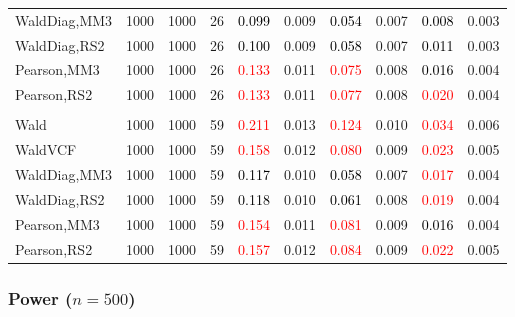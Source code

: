 \documentclass[
]{article}
\begin{document}
\begin{table}[H]
{\begin{tabular}[t]{lrrrrrrlrr}
\hspace{1em}WaldDiag,MM3 & 1000 & 1000 & 26 & \textcolor{black}{0.099} & 0.009 & \textcolor{black}{0.054} & 0.007 & \textcolor{black}{0.008} & 0.003\\
\hspace{1em}WaldDiag,RS2 & 1000 & 1000 & 26 & \textcolor{black}{0.100} & 0.009 & \textcolor{black}{0.058} & 0.007 & \textcolor{black}{0.011} & 0.003\\
\hspace{1em}Pearson,MM3 & 1000 & 1000 & 26 & \textcolor{red}{0.133} & 0.011 & \textcolor{red}{0.075} & 0.008 & \textcolor{black}{0.016} & 0.004\\
\hspace{1em}Pearson,RS2 & 1000 & 1000 & 26 & \textcolor{red}{0.133} & 0.011 & \textcolor{red}{0.077} & 0.008 & \textcolor{red}{0.020} & 0.004\\
\addlinespace[0.3em]
\multicolumn{10}{l}{\textbf{3F 15V}}\\
\hspace{1em}Wald & 1000 & 1000 & 59 & \textcolor{red}{0.211} & 0.013 & \textcolor{red}{0.124} & 0.010 & \textcolor{red}{0.034} & 0.006\\
\hspace{1em}WaldVCF & 1000 & 1000 & 59 & \textcolor{red}{0.158} & 0.012 & \textcolor{red}{0.080} & 0.009 & \textcolor{red}{0.023} & 0.005\\
\hspace{1em}WaldDiag,MM3 & 1000 & 1000 & 59 & \textcolor{black}{0.117} & 0.010 & \textcolor{black}{0.058} & 0.007 & \textcolor{red}{0.017} & 0.004\\
\hspace{1em}WaldDiag,RS2 & 1000 & 1000 & 59 & \textcolor{black}{0.118} & 0.010 & \textcolor{black}{0.061} & 0.008 & \textcolor{red}{0.019} & 0.004\\
\hspace{1em}Pearson,MM3 & 1000 & 1000 & 59 & \textcolor{red}{0.154} & 0.011 & \textcolor{red}{0.081} & 0.009 & \textcolor{black}{0.016} & 0.004\\
\hspace{1em}Pearson,RS2 & 1000 & 1000 & 59 & \textcolor{red}{0.157} & 0.012 & \textcolor{red}{0.084} & 0.009 & \textcolor{red}{0.022} & 0.005\\
\bottomrule
\end{tabular}}
\endgroup{}
\end{table}

\hypertarget{power-n500-3}{%
\subsubsection{\texorpdfstring{Power
(\(n=500\))}{Power (n=500)}}\label{power-n500-3}}
\end{document}
